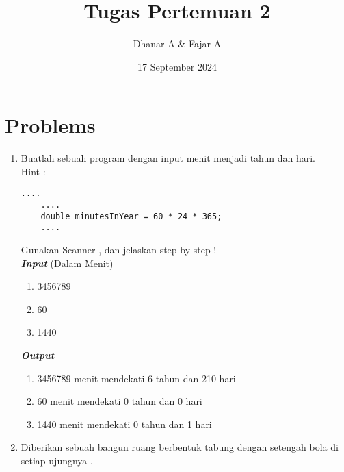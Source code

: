 \documentclass[a4paper, 12pt]{article}
\title{Tugas Pertemuan 2}
\author{Dhanar A \& Fajar A}
\date{17 September 2024}
\begin{document}
\maketitle

\section*{Problems}
\begin{enumerate}
    \item Buatlah sebuah program dengan input menit menjadi tahun dan hari. \\
    Hint :
    \begin{lstlisting}[style=standard]
    ....
    ....
    double minutesInYear = 60 * 24 * 365;
    ....
    \end{lstlisting}
    Gunakan Scanner , dan jelaskan step by step !\\

    \textbf{\textit{Input}} (Dalam Menit)
    \begin{enumerate}
        \item 3456789 
        \item 60 
        \item 1440 
    \end{enumerate}
    \textbf{\textit{Output}}
    \begin{enumerate}
        \item 3456789 menit  mendekati 6 tahun dan 210 hari
        \item 60 menit  mendekati 0 tahun dan 0 hari
        \item 1440 menit  mendekati 0 tahun dan 1 hari
    \end{enumerate}
    \newpage
    \item  Diberikan sebuah bangun ruang berbentuk tabung dengan setengah bola di setiap ujungnya .
    \begin{center}
\end{center}
\end{enumerate}
\end{document}
